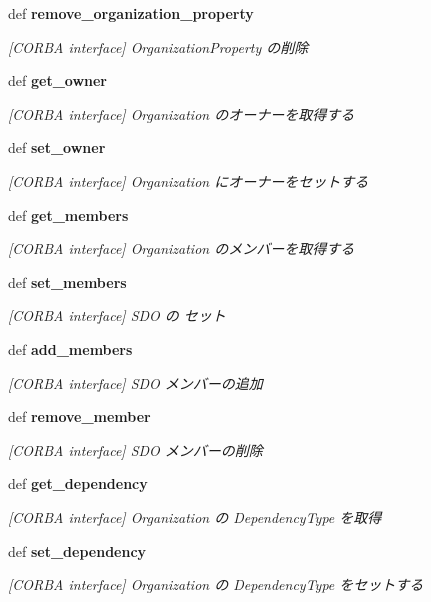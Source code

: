 \begin{CompactItemize}
def {\bf remove\_\-organization\_\-property}
\begin{CompactList}\small\item\em [CORBA interface] OrganizationProperty の削除 \item\end{CompactList}\item 
def {\bf get\_\-owner}
\begin{CompactList}\small\item\em [CORBA interface] Organization のオーナーを取得する \item\end{CompactList}\item 
def {\bf set\_\-owner}
\begin{CompactList}\small\item\em [CORBA interface] Organization にオーナーをセットする \item\end{CompactList}\item 
def {\bf get\_\-members}
\begin{CompactList}\small\item\em [CORBA interface] Organization のメンバーを取得する \item\end{CompactList}\item 
def {\bf set\_\-members}
\begin{CompactList}\small\item\em [CORBA interface] SDO の セット \item\end{CompactList}\item 
def {\bf add\_\-members}
\begin{CompactList}\small\item\em [CORBA interface] SDO メンバーの追加 \item\end{CompactList}\item 
def {\bf remove\_\-member}
\begin{CompactList}\small\item\em [CORBA interface] SDO メンバーの削除 \item\end{CompactList}\item 
def {\bf get\_\-dependency}
\begin{CompactList}\small\item\em [CORBA interface] Organization の DependencyType を取得 \item\end{CompactList}\item 
def {\bf set\_\-dependency}
\begin{CompactList}\small\item\em [CORBA interface] Organization の DependencyType をセットする \item\end{CompactList}\end{CompactItemize}
